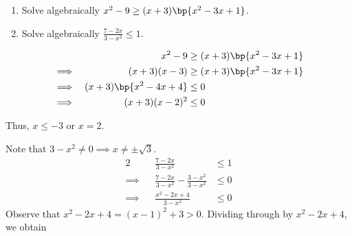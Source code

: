 \begin{problem}
    \begin{enumerate}
        \item Solve algebraically $x^2 - 9 \geq (x+3)\bp{x^2 - 3x + 1}$.
        \item Solve algebraically $\frac{7-2x}{3-x^2} \leq 1$.
    \end{enumerate}
\end{problem}
\begin{solution}
    \begin{ppart}
        \begin{alignat*}{2}
            &&x^2-9 &\geq (x+3)\bp{x^2 - 3x + 1} \\
            \implies &&(x+3)(x-3) &\geq (x+3)\bp{x^2 - 3x + 1} \\
            \implies &&(x+3)\bp{x^2 - 4x + 4} &\leq 0 \\
            \implies &&(x+3)(x-2)^2 &\leq 0
        \end{alignat*}
        \begin{center}
        \end{center}
        Thus, $x \leq -3$ or $x = 2$.
    \end{ppart}
    \begin{ppart}
        Note that $3-x^2 \neq 0 \implies x \neq \pm \sqrt{3}$.
        \begin{alignat*}{2}
            &&\frac{7-2x}{3-x^2} &\leq 1\\
            \implies &&\frac{7-2x}{3-x^2} - \frac{3-x^2}{3-x^2} &\leq 0\\
            \implies&& \frac{x^2-2x+4}{3-x^2} &\leq 0
        \end{alignat*}
        Observe that $x^2 - 2x + 4 = (x-1)^2 + 3 > 0$. Dividing through by $x^2 - 2x + 4$, we obtain

\end{ppart}
\end{solution}
